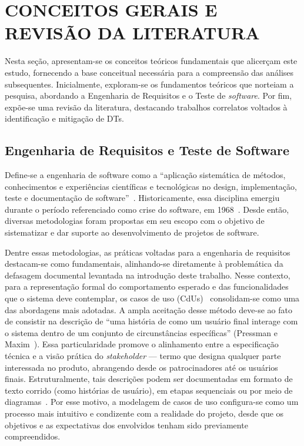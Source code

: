 \section{CONCEITOS GERAIS E REVISÃO DA LITERATURA}

Nesta seção, apresentam-se os conceitos teóricos fundamentais que alicerçam este estudo, fornecendo a base conceitual necessária para a compreensão das análises subsequentes. Inicialmente, exploram-se os fundamentos teóricos que norteiam a pesquisa, abordando a Engenharia de Requisitos e o Teste de \textit{software}. Por fim, expõe-se uma revisão da literatura, destacando trabalhos correlatos voltados à identificação e mitigação de DTs.

\subsection{Engenharia de Requisitos e Teste de Software}
\label{sec:engenharia_requisitos_teste_software}

Define-se a engenharia de software como a ``aplicação sistemática de métodos, conhecimentos e experiências científicas e tecnológicas no design, implementação, teste e documentação de software''~\cite[p. 424, tradução nossa]{27}. Historicamente, essa disciplina emergiu durante o período referenciado como crise do software, em 1968~\cite{28}. Desde então, diversas metodologias foram propostas em seu escopo com o objetivo de sistematizar e dar suporte ao desenvolvimento de projetos de software.

Dentre essas metodologias, as práticas voltadas para a engenharia de requisitos destacam-se como fundamentais, alinhando-se diretamente à problemática da defasagem documental levantada na introdução deste trabalho. Nesse contexto, para a representação formal do comportamento esperado e das funcionalidades que o sistema deve contemplar, os casos de uso (CdUs)~\cite{2} consolidam-se como uma das abordagens mais adotadas. A ampla aceitação desse método deve-se ao fato de consistir na descrição de ``uma história de como um usuário final interage com o sistema dentro de um conjunto de circunstâncias específicas'' (Pressman e Maxim~\cite[p. 114, tradução nossa]{24}). Essa particularidade promove o alinhamento entre a especificação técnica e a visão prática do \textit{stakeholder} --- termo que designa qualquer parte interessada no produto, abrangendo desde os patrocinadores até os usuários finais. Estruturalmente, tais descrições podem ser documentadas em formato de texto corrido (como histórias de usuário), em etapas sequenciais ou por meio de diagramas~\cite{24}. Por esse motivo, a modelagem de casos de uso configura-se como um processo mais intuitivo e condizente com a realidade do projeto, desde que os objetivos e as expectativas dos envolvidos tenham sido previamente compreendidos.

